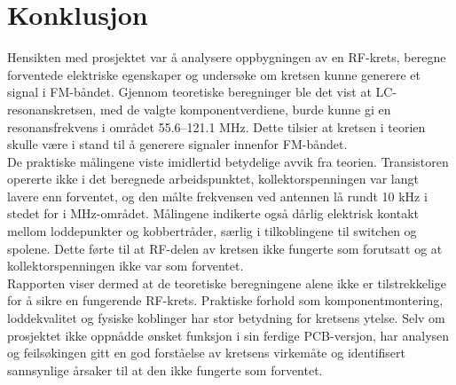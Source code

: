 \section{Konklusjon}

Hensikten med prosjektet var å analysere oppbygningen av en RF-krets, beregne forventede elektriske egenskaper og undersøke om kretsen kunne generere et signal i FM-båndet. Gjennom teoretiske beregninger ble det vist at LC-resonanskretsen, med de valgte komponentverdiene, burde kunne gi en resonansfrekvens i området 55.6--121.1 MHz. Dette tilsier at kretsen i teorien skulle være i stand til å generere signaler innenfor FM-båndet.
\\[1em]
De praktiske målingene viste imidlertid betydelige avvik fra teorien. Transistoren opererte ikke i det beregnede arbeidspunktet, kollektorspenningen var langt lavere enn forventet, og den målte frekvensen ved antennen lå rundt 10 kHz i stedet for i MHz-området. Målingene indikerte også dårlig elektrisk kontakt mellom loddepunkter og kobbertråder, særlig i tilkoblingene til switchen og spolene. Dette førte til at RF-delen av kretsen ikke fungerte som forutsatt og at kollektorspenningen ikke var som forventet.
\\[1em]
Rapporten viser dermed at de teoretiske beregningene alene ikke er tilstrekkelige for å sikre en fungerende RF-krets. Praktiske forhold som komponentmontering, loddekvalitet og fysiske koblinger har stor betydning for kretsens ytelse. Selv om prosjektet ikke oppnådde ønsket funksjon i sin ferdige PCB-versjon, har analysen og feilsøkingen gitt en god forståelse av kretsens virkemåte og identifisert sannsynlige årsaker til at den ikke fungerte som forventet.